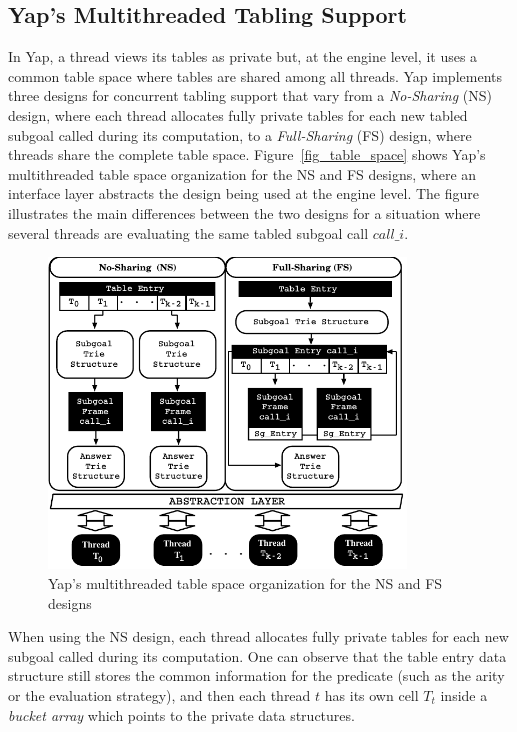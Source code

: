 \documentclass{llncs}
\begin{document}
\subsection{Yap's Multithreaded Tabling Support}

In Yap, a thread views its tables as private but, at the engine level,
it uses a common table space where tables are shared among all
threads. Yap implements three designs for concurrent tabling support
that vary from a \emph{No-Sharing} (NS) design, where each thread
allocates fully private tables for each new tabled subgoal called
during its computation, to a \emph{Full-Sharing} (FS) design, where
threads share the complete table space. Figure~\ref{fig_table_space}
shows Yap's multithreaded table space organization for the NS and FS
designs, where an interface layer abstracts the design being used at
the engine level. The figure illustrates the main differences between
the two designs for a situation where several threads are evaluating
the same tabled subgoal call $call\_i$.

\begin{figure}[!ht]
\centering
\includegraphics[width=9.5cm]{figures/yap-mt.pdf}
\caption{Yap's multithreaded table space organization for the NS and FS designs}
\label{fig_yap_mt_support}
\end{figure}

When using the NS design, each thread allocates fully private tables
for each new subgoal called during its computation. One can observe
that the table entry data structure still stores the common
information for the predicate (such as the arity or the evaluation
strategy), and then each thread $t$ has its own cell $T_t$ inside a
\emph{bucket array} which points to the private data structures.
\end{document}
